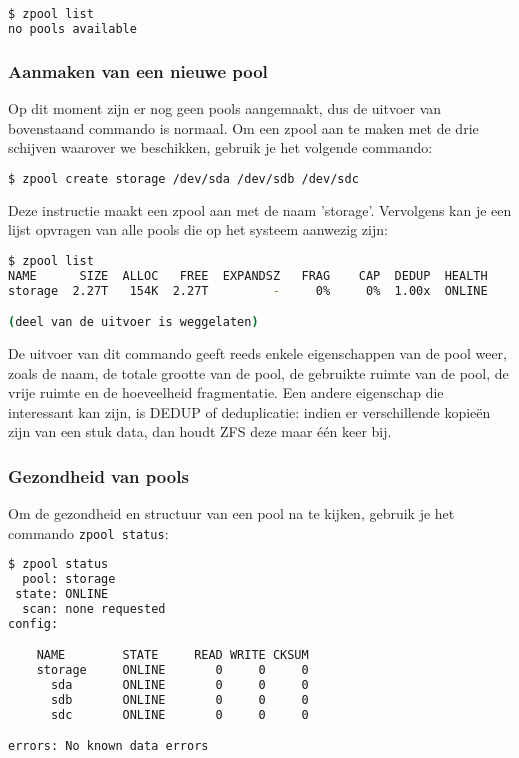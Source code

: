 \begin{lstlisting}[language=bash,style=command_style]
$ zpool list
no pools available
\end{lstlisting}

\subsubsection{Aanmaken van een nieuwe pool}

Op dit moment zijn er nog geen pools aangemaakt, dus de uitvoer van bovenstaand commando is normaal. Om een zpool aan te maken met de drie schijven waarover we beschikken, gebruik je het volgende commando:

\begin{lstlisting}[language=bash,style=command_style]
$ zpool create storage /dev/sda /dev/sdb /dev/sdc
\end{lstlisting}

Deze instructie maakt een zpool aan met de naam 'storage'. Vervolgens kan je een lijst opvragen van alle pools die op het systeem aanwezig zijn:

\begin{lstlisting}[language=bash,style=command_style]
$ zpool list
NAME      SIZE  ALLOC   FREE  EXPANDSZ   FRAG    CAP  DEDUP  HEALTH 
storage  2.27T   154K  2.27T         -     0%     0%  1.00x  ONLINE 

(deel van de uitvoer is weggelaten)

\end{lstlisting}

De uitvoer van dit commando geeft reeds enkele eigenschappen van de pool weer, zoals de naam, de totale grootte van de pool, de gebruikte ruimte van de pool, de vrije ruimte en de hoeveelheid fragmentatie. Een andere eigenschap die interessant kan zijn, is DEDUP of deduplicatie: indien er verschillende kopieën zijn van een stuk data, dan houdt ZFS deze maar één keer bij. 

\subsubsection{Gezondheid van pools}

Om de gezondheid en structuur van een pool na te kijken, gebruik je het commando \texttt{zpool status}:

\begin{lstlisting}[language=bash,style=command_style]
$ zpool status
  pool: storage
 state: ONLINE
  scan: none requested
config:

	NAME        STATE     READ WRITE CKSUM
	storage     ONLINE       0     0     0
	  sda       ONLINE       0     0     0
	  sdb       ONLINE       0     0     0
	  sdc       ONLINE       0     0     0

errors: No known data errors
\end{lstlisting}

